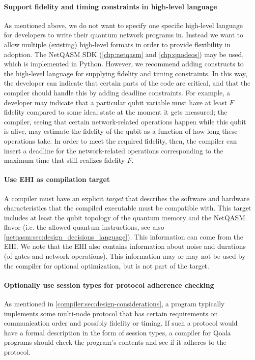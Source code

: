 \paragraph{Support fidelity and timing constraints in high-level language}
As mentioned above, we do not want to specify one specific high-level language for developers to write their quantum network programs in.
Instead we want to allow multiple (existing) high-level formats in order to provide flexibility in adoption.
The NetQASM SDK (\cref{chp:netqasm} and \cref{chp:qnodeos}) may be used, which is implemented in Python.
However, we recommend adding constructs to the high-level language for supplying fidelity and timing constraints.
In this way, the developer can indicate that certain parts of the code are critical, and that the compiler should handle this by adding deadline constraints.
For example, a developer may indicate that a particular qubit variable must have at least $F$ fidelity compared to some ideal state at the moment it gets measured;
the compiler, seeing that certain network-related operations happen while this qubit is alive, may estimate the fidelity of the qubit as a function of how long these operations take.
In order to meet the required fidelity, then, the compiler can insert a deadline for the network-related operations corresponding to the maximum time that still realizes fidelity $F$.


\paragraph{Use \acf{EHI} as compilation target}
A compiler must have an explicit \emph{target} that describes the software and hardware characteristics that the compiled executable must be compatible with.
This target includes at least the qubit topology of the quantum memory and the NetQASM flavor (i.e. the allowed quantum instructions, see also \cref{netqasm:sec:design_decisions_language}).
This information can come from the \ac{EHI}.
We note that the \ac{EHI} also contains information about noise and durations (of gates and network operations).
This information may or may not be used by the compiler for optional optimization, but is not part of the target.

\paragraph{Optionally use session types for protocol adherence checking}
As mentioned in \cref{compiler:sec:design-considerations}, a program typically implements some multi-node protocol that has certain requirements on communication order and possibly fidelity or timing.
If such a protocol would have a formal description in the form of session types, a compiler for Qoala programs should check the program's contents and see if it adheres to the protocol.

